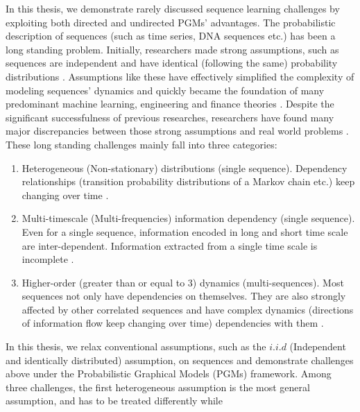 In this thesis, we demonstrate rarely discussed sequence learning
challenges by exploiting both directed and undirected PGMs'
advantages. The probabilistic description of sequences (such as
time series, DNA sequences etc.) has been a long standing
problem. Initially, researchers made strong assumptions, such as
sequences are independent and have identical (following the same)
probability distributions
\cite{bachelier1900theorie,friedman1953methodology}. Assumptions
like these have effectively simplified the complexity of modeling
sequences' dynamics and quickly became the foundation of many
predominant machine learning, engineering and finance theories
\cite{jegadeesh1993returns,shiller1980stock,
  sharpe1964capital,carhart1997persistence,sargent1993bounded}.
Despite the significant successfulness of previous researches,
researchers have found many major discrepancies between those
strong assumptions and real world problems
\cite{lux2008markov,mandelbrot1963new,lux2007forecasting,
  abry2019shuffling, li2019multi, mandelbrot1997multifractal}.
These long standing challenges mainly fall into three categories:
%
\begin{enumerate}
\item Heterogeneous (Non-stationary) distributions (single
  sequence). Dependency relationships (\eg transition probability
  distributions of a Markov chain etc.) keep changing over time
  \cite{ross1996stochastic}.
\item Multi-timescale (Multi-frequencies) information dependency
  (single sequence). Even for a single sequence, information
  encoded in long and short time scale are inter-dependent.
  Information extracted from a single time scale is incomplete
  \cite{mandelbrot1997multifractal}.
\item Higher-order (greater than or equal to 3) dynamics
  (multi-sequences). Most sequences not only have dependencies on
  themselves. They are also strongly affected by other correlated
  sequences and have complex dynamics (\eg directions of
  information flow keep changing over time) dependencies with
  them
  \cite{lo1990contrarian,badrinath1995shepherds,mcqueen1996delayed}.
\end{enumerate}
%
In this thesis, we relax conventional assumptions, such as the
$i.i.d$ (Independent and identically distributed) assumption, on
sequences and demonstrate challenges above under the
Probabilistic Graphical Models (PGMs) framework. Among three
challenges, the first heterogeneous assumption is the most
general assumption, and has to be treated differently while
